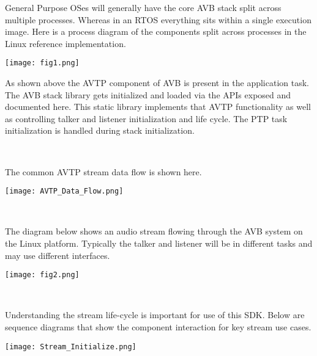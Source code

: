 General Purpose O\+Ses will generally have the core A\+VB stack split across multiple processes. Whereas in an R\+T\+OS everything sits within a single execution image. Here is a process diagram of the components split across processes in the Linux reference implementation.


\begin{DoxyImage}
\texttt{[image: fig1.png]}
\caption{A\+VB Components}
\end{DoxyImage}


As shown above the A\+V\+TP component of A\+VB is present in the application task. The A\+VB stack library gets initialized and loaded via the A\+P\+Is exposed and documented here. This static library implements that A\+V\+TP functionality as well as controlling talker and listener initialization and life cycle. The P\+TP task initialization is handled during stack initialization.

~\newline


The common A\+V\+TP stream data flow is shown here.


\begin{DoxyImage}
\texttt{[image: AVTP\_Data\_Flow.png]}
\caption{A\+V\+PT Data Flow}
\end{DoxyImage}


~\newline


The diagram below shows an audio stream flowing through the A\+VB system on the Linux platform. Typically the talker and listener will be in different tasks and may use different interfaces.


\begin{DoxyImage}
\texttt{[image: fig2.png]}
\caption{A\+VB Audio Stream Flow}
\end{DoxyImage}


~\newline


Understanding the stream life-\/cycle is important for use of this S\+DK. Below are sequence diagrams that show the component interaction for key stream use cases.


\begin{DoxyImage}
\texttt{[image: Stream\_Initialize.png]}
\caption{Stream Initialization}
\end{DoxyImage}


~\newline



